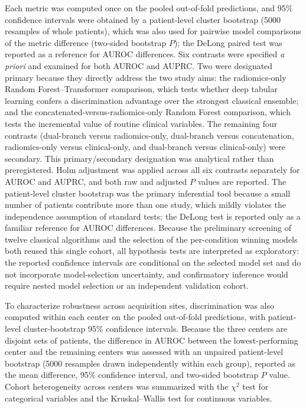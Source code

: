\documentclass[11pt]{article}
\begin{document}
Each metric was computed once on the pooled out-of-fold predictions, and 95\%
confidence intervals were obtained by a patient-level cluster bootstrap (5000
resamples of whole patients), which was also used for pairwise model comparisons
of the metric difference (two-sided bootstrap $P$); the DeLong paired test was
reported as a reference for AUROC differences. Six contrasts were specified
\emph{a priori} and examined for both AUROC and AUPRC. Two were designated
primary because they directly address the two study aims: the radiomics-only
Random Forest--Transformer comparison, which tests whether deep tabular learning
confers a discrimination advantage over the strongest classical ensemble; and
the concatenated-versus-radiomics-only Random Forest comparison, which tests the
incremental value of routine clinical variables. The remaining four contrasts
(dual-branch versus radiomics-only, dual-branch versus concatenation,
radiomics-only versus clinical-only, and dual-branch versus clinical-only) were
secondary. This primary/secondary designation was analytical rather than
preregistered. Holm adjustment was applied across all six contrasts separately
for AUROC and AUPRC, and both raw and adjusted $P$ values are reported. The
patient-level cluster bootstrap was the primary inferential tool because a small
number of patients contribute more than one study, which mildly violates the
independence assumption of standard tests; the DeLong test is reported only as a
familiar reference for AUROC differences. Because the preliminary screening of
twelve classical algorithms and the selection of the per-condition winning models
both reused this single cohort, all hypothesis tests are interpreted as
exploratory: the reported confidence intervals are conditional on the selected
model set and do not incorporate model-selection uncertainty, and confirmatory
inference would require nested model selection or an independent validation cohort.

To characterize robustness across acquisition sites, discrimination was also
computed within each center on the pooled out-of-fold predictions, with
patient-level cluster-bootstrap 95\% confidence intervals. Because the three
centers are disjoint sets of patients, the difference in AUROC between the
lowest-performing center and the remaining centers was assessed with an unpaired
patient-level bootstrap (5000 resamples drawn independently within each group),
reported as the mean difference, 95\% confidence interval, and two-sided
bootstrap $P$ value. Cohort heterogeneity across centers was summarized with the
$\chi^2$ test for categorical variables and the Kruskal--Wallis test for
continuous variables.
\end{document}
